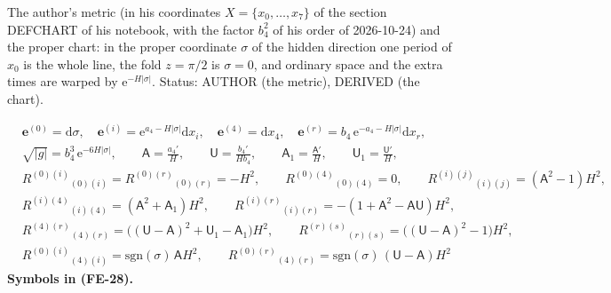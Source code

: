 \documentclass[
  10pt,
]{article}
\begin{document}
The author's metric (in his coordinates \(X = \{x_0, \dots, x_7\}\) of
the section DEFCHART of his notebook, with the factor \(b_4^2\) of his
order of 2026-10-24) and the proper chart: in the proper coordinate
\(\sigma\) of the hidden direction one period of \(x_0\) is the whole
line, the fold \(z = \pi/2\) is \(\sigma = 0\), and ordinary space and
the extra times are warped by \(\mathrm{e}^{-H\lvert\sigma\rvert}\).
Status: AUTHOR (the metric), DERIVED (the chart).

\[
\begin{aligned}
&\mathbf{e}^{(0)} = \mathrm{d}\sigma,\quad \mathbf{e}^{(i)} = \mathrm{e}^{a_4 - H\lvert\sigma\rvert}\mathrm{d}x_i,\quad
 \mathbf{e}^{(4)} = \mathrm{d}x_4,\quad \mathbf{e}^{(r)} = b_4\,\mathrm{e}^{-a_4 - H\lvert\sigma\rvert}\mathrm{d}x_r,\\
&\sqrt{\lvert g\rvert} = b_4^3\,\mathrm{e}^{-6H\lvert\sigma\rvert},\qquad
 \mathsf{A} = \frac{a_4'}{H},\qquad \mathsf{U} = \frac{b_4'}{Hb_4},\qquad \mathsf{A}_1 = \frac{\mathsf{A}'}{H},\qquad
 \mathsf{U}_1 = \frac{\mathsf{U}'}{H},\\
&R^{(0)(i)}{}_{(0)(i)} = R^{(0)(r)}{}_{(0)(r)} = -H^2,\qquad R^{(0)(4)}{}_{(0)(4)} = 0,\qquad
 R^{(i)(j)}{}_{(i)(j)} = (\mathsf{A}^2 - 1)H^2,\\
&R^{(i)(4)}{}_{(i)(4)} = (\mathsf{A}^2 + \mathsf{A}_1)H^2,\qquad
 R^{(i)(r)}{}_{(i)(r)} = -(1 + \mathsf{A}^2 - \mathsf{A}\mathsf{U})H^2,\\
&R^{(4)(r)}{}_{(4)(r)} = \big((\mathsf{U} - \mathsf{A})^2 + \mathsf{U}_1 - \mathsf{A}_1\big)H^2,\qquad
 R^{(r)(s)}{}_{(r)(s)} = \big((\mathsf{U} - \mathsf{A})^2 - 1\big)H^2,\\
&R^{(0)(i)}{}_{(4)(i)} = \mathrm{sgn}(\sigma)\,\mathsf{A}H^2,\qquad
 R^{(0)(r)}{}_{(4)(r)} = \mathrm{sgn}(\sigma)\,(\mathsf{U} - \mathsf{A})H^2
\end{aligned} \tag{FE-28}
\] \textbf{Symbols in (FE-28).}
\end{document}
